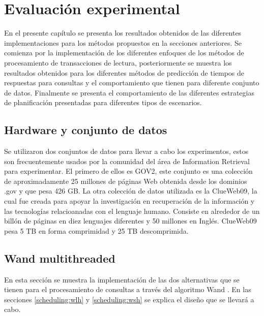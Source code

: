 \chapter{Evaluación experimental}
\label{cap:evaluacionexperimental}

En el presente capítulo se presenta los resultados obtenidos de las diferentes implementaciones para los métodos propuestos en la secciones anteriores. Se comienza por la implementación de los diferentes enfoques de los métodos de procesamiento de transacciones de lectura, posteriormente se muestra los resultados obtenidos para los diferentes métodos de predicción de tiempos de respuestas para consultas y el comportamiento que tienen para diferente conjunto de datos. Finalmente se presenta el comportamiento de las diferentes estrategias de planificación presentadas para diferentes tipos de escenarios.


\section{Hardware y conjunto de datos}
\label{evaluacionexperimental:hardwareydatos}

Se utilizaron dos conjuntos de datos para llevar a cabo los experimentos, estos son frecuentemente usados por la comunidad del área de Information Retrieval para experimentar. El primero de ellos es GOV2, este conjunto es una colección de aproximadamente 25 millones de páginas Web obtenida desde los dominios .gov y que pesa 426 GB. La otra colección de datos utilizada es la ClueWeb09, la cual fue creada para apoyar la investigación en recuperación de la información y las tecnologías relacioanadas con el lenguaje humano. Consiste en alrededor de un billón de páginas en diez lenguajes diferentes y 50 millones en Inglés. ClueWeb09 pesa 5 TB en forma comprimidad y 25 TB descomprimida. 






\section{Wand multithreaded}
\label{evaluacionexperimental:wm}
En esta sección se muestra la implementación de las dos alternativas que se tienen para el procesamiento de consultas a través del algoritmo Wand \citep{Broder:2003}. En las secciones \ref{scheduling:wlh} y \ref{scheduling:wsh} se explica el diseño que se llevará a cabo. 

